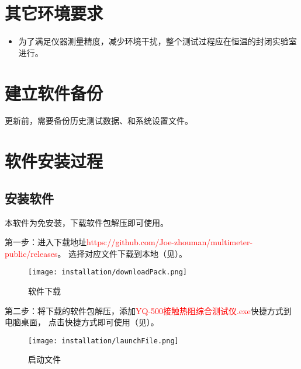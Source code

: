\section{其它环境要求}
\begin{itemize}
    \item 为了满足仪器测量精度，减少环境干扰，整个测试过程应在恒温的封闭实验室进行。
\end{itemize}

\section{建立软件备份}
更新前，需要备份历史测试数据、和系统设置文件。

\section{软件安装过程}
\subsection{安装软件\label{subsec:install}}
\par 本软件为免安装，下载软件包解压即可使用。
\par 第一步：进入下载地址\textcolor{red}{https://github.com/Joe-zhouman/multimeter-public/releases}。
选择对应文件下载到本地（见）。
\begin{figure}[H]
    \centering
    \texttt{[image: installation/downloadPack.png]}
    \caption{ 软件下载 \label{fig:downloadPack}}
\end{figure}
\par 第二步：将下载的软件包解压，添加\textcolor{red}{YQ-500接触热阻综合测试仪.exe}快捷方式到电脑桌面，
点击快捷方式即可使用（见）。
\begin{figure}[H]
    \centering
    \texttt{[image: installation/launchFile.png]}
    \caption{ 启动文件 \label{fig:launchFile}}
\end{figure}
